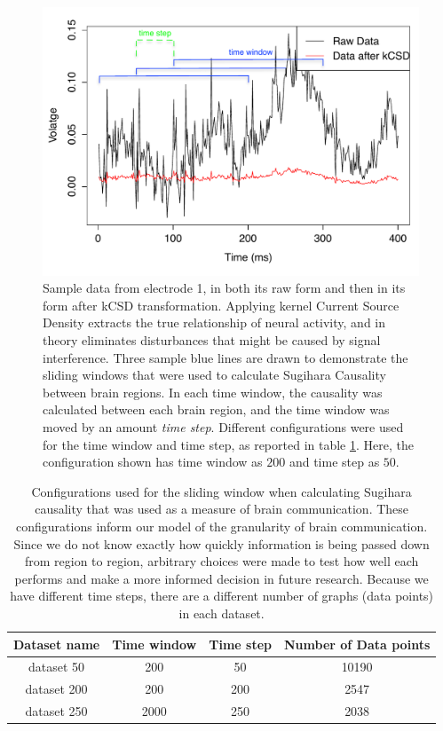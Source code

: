 \documentclass[journal,12pt,onecolumn,draftclsnofoot]{IEEEtran}  %
\begin{document}
\begin{figure}[H]
  \includegraphics[width=\linewidth]{figures/sample_eeg_signal_with_kcsd_edited.pdf}
  \caption{Sample data from electrode 1, in both its raw form and then in its form after kCSD transformation. Applying kernel Current Source Density extracts the true relationship of neural activity, and in theory eliminates disturbances that might be caused by signal interference. Three sample blue lines are drawn to demonstrate the sliding windows that were used to calculate Sugihara Causality between brain regions. In each time window, the causality was calculated between each brain region, and the time window was moved by an amount \textit{time step}. Different configurations were used for the time window and time step, as reported in table \ref{tab:sliding_window_configuration}. Here, the configuration shown has time window as $200$ and time step as $50$.}
  \label{fig:example_eeg_and_kcsd}
\end{figure}

\begin{table}[H]
\centering
\caption{Configurations used for the sliding window when calculating Sugihara causality that was used as a measure of brain communication. These configurations inform our model of the granularity of brain communication. Since we do not know exactly how quickly information is being passed down from region to region, arbitrary choices were made to test how well each performs and make a more informed decision in future research. Because we have different time steps, there are a different number of graphs (data points) in each dataset.}
\label{tab:sliding_window_configuration}
\begin{tabular}{|c|c|c|c|}
\hline
 Dataset name &  Time window &  Time step & Number of Data points\\ \hline
 
 dataset 50 & 200 & 50 & 10190 \\ \hline
 dataset 200 & 200 & 200 & 2547 \\ \hline
 dataset 250 & 2000 & 250 &  2038 \\ \hline
\end{tabular}
\end{table}
\end{document}
